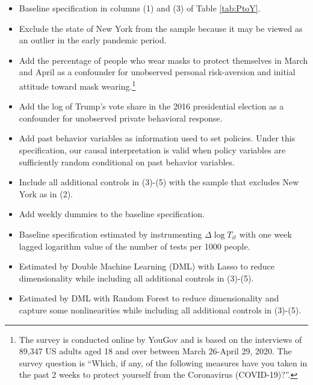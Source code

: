 \documentclass[11pt,reqno,letter]{amsart}
\theoremstyle{definition}
\begin{document}
  \begin{itemize}
  \item[(1)] Baseline specification  in columns (1) and (3) of Table  \ref{tab:PtoY}.
  \item[(2)]  Exclude  the state of New York from the sample because it may be viewed as an outlier in the early pandemic period.
  \item[(3)]   Add  the percentage of people who wear masks to protect themselves in March and April as a confounder for unobserved  personal risk-aversion and initial attitude toward mask wearing.\footnote{ The survey is conducted online by YouGov and is based on the interviews of 89,347 US adults aged 18 and over between March 26-April 29, 2020.  The survey question is ``Which, if any, of the following measures have you taken in the past 2 weeks to protect yourself from the Coronavirus (COVID-19)?''.}
   \item[(4)]   Add the log of Trump's vote share  in the 2016 presidential election as a confounder for unobserved private behavioral response.
   \item[(5)]   Add  past behavior variables  as information used to set policies. Under this specification, our causal interpretation is valid when policy variables are sufficiently random conditional on past behavior variables.
   \item[(6)]   Include all additional controls in (3)-(5) with the sample that excludes New York as in (2).
   \item[(7)] Add weekly dummies  to the baseline specification.
   \item[(8)] Baseline specification estimated by instrumenting $\Delta \log T_{it}$ with one week lagged  logarithm  value of the number of tests per 1000 people.
   \item[(9)]   Estimated by Double Machine Learning (DML) \citep[e.g.,][]{chernozhukov18} with Lasso to reduce dimensionality while including all additional controls in (3)-(5).     \item[(10)]  Estimated by DML with Random Forest to reduce dimensionality  and capture some nonlinearities while including all additional controls in (3)-(5).   %
  \end{itemize}
\end{document}
